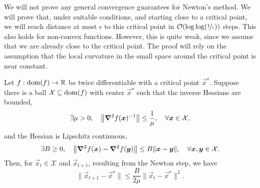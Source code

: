 We will not prove any general convergence guarantees for Newton's method. We will prove that, under
suitable conditions, and starting close to a critical point, we will reach distance at most
$\epsilon$ to this critical point in $\bigo{\log \log(\nicefrac{1}{\epsilon})}$ steps. This also
holds for non-convex functions. However, this is quite weak, since we assume that we are already
close to the critical point. The proof will rely on the assumption that the local curvature in the
small space around the critical point is near constant.

\begin{theorem} \label{thm:newton}
    Let $f: \mathrm{dom}(f) \to \mathbb{R}$ be twice differentiable with a critical point $\vec{x}^\star$. Suppose there is a ball $\mathcal{X} \subseteq \mathrm{dom}(f)$ with center $\vec{x}^\star$ such that the inverse Hessians are bounded, \[
        \exists \mu > 0, \quad \lft\| \inv{\hess{f(\vec{x})}{}} \rgt\| \leq \frac{1}{\mu}, \quad \forall \vec{x} \in \mathcal{X},
    \]
    and the Hessian is Lipschitz continuous, \[
        \exists B \geq 0, \quad \lft\| \hess{f(\vec{x})}{} - \hess{f(\vec{y})}{} \rgt\| \leq B \| \vec{x} - \vec{y} \|, \quad \forall \vec{x},\vec{y}\in \mathcal{X}.
    \]
    Then, for $\vec{x}_t \in \mathcal{X}$ and $\vec{x}_{t+1}$, resulting from the Newton step, we have \[
        \| \vec{x}_{t+1} - \vec{x}^\star \| \leq \frac{B}{2 \mu} \| \vec{x}_t - \vec{x}^\star \|^2.
    \]
\end{theorem}


